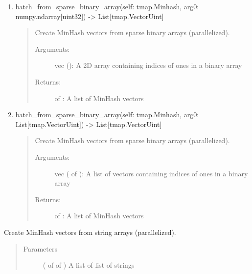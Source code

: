 \documentclass[letterpaper,10pt,english]{sphinxmanual}
\begin{document}
\begin{fulllineitems}
\begin{fulllineitems}
\begin{enumerate}
\item {} 
batch\_from\_sparse\_binary\_array(self: tmap.Minhash, arg0: numpy.ndarray{[}uint32{]}) -\textgreater{} List{[}tmap.VectorUint{]}
\begin{quote}

Create MinHash vectors from sparse binary arrays (parallelized).
\begin{description}
\item[{Arguments:}] \leavevmode
vec (): A 2D array containing indices of ones in a binary array

\item[{Returns:}] \leavevmode
{} of : A list of MinHash vectors

\end{description}
\end{quote}

\item {} 
batch\_from\_sparse\_binary\_array(self: tmap.Minhash, arg0: List{[}tmap.VectorUint{]}) -\textgreater{} List{[}tmap.VectorUint{]}
\begin{quote}

Create MinHash vectors from sparse binary arrays (parallelized).
\begin{description}
\item[{Arguments:}] \leavevmode
vec ( of ): A list of vectors containing indices of ones in a binary array

\item[{Returns:}] \leavevmode
{} of : A list of MinHash vectors

\end{description}
\end{quote}

\end{enumerate}

\end{fulllineitems}


\begin{fulllineitems}
\label{\detokenize{documentation:tmap.Minhash.batch_from_string_array}}
Create MinHash vectors from string arrays (parallelized).
\begin{quote}\begin{description}
\item[{Parameters}] \leavevmode
{} ( of  of ) \textendash{} A list of list of strings


\end{description}
\end{quote}
\end{fulllineitems}
\end{fulllineitems}
\end{document}
